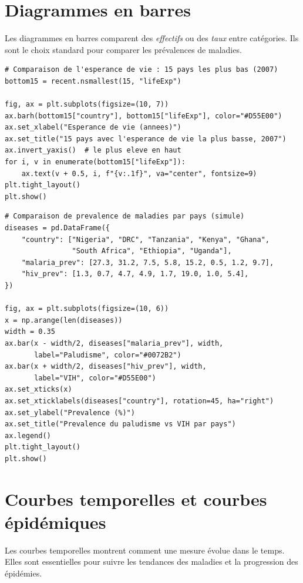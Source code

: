 \section{Diagrammes en barres}

Les diagrammes en barres comparent des \emph{effectifs} ou des \emph{taux} entre cat\'egories. Ils sont le choix standard pour comparer les pr\'evalences de maladies.

\begin{verbatim}
# Comparaison de l'esperance de vie : 15 pays les plus bas (2007)
bottom15 = recent.nsmallest(15, "lifeExp")

fig, ax = plt.subplots(figsize=(10, 7))
ax.barh(bottom15["country"], bottom15["lifeExp"], color="#D55E00")
ax.set_xlabel("Esperance de vie (annees)")
ax.set_title("15 pays avec l'esperance de vie la plus basse, 2007")
ax.invert_yaxis()  # le plus eleve en haut
for i, v in enumerate(bottom15["lifeExp"]):
    ax.text(v + 0.5, i, f"{v:.1f}", va="center", fontsize=9)
plt.tight_layout()
plt.show()
\end{verbatim}

\begin{verbatim}
# Comparaison de prevalence de maladies par pays (simule)
diseases = pd.DataFrame({
    "country": ["Nigeria", "DRC", "Tanzania", "Kenya", "Ghana",
                "South Africa", "Ethiopia", "Uganda"],
    "malaria_prev": [27.3, 31.2, 7.5, 5.8, 15.2, 0.5, 1.2, 9.7],
    "hiv_prev": [1.3, 0.7, 4.7, 4.9, 1.7, 19.0, 1.0, 5.4],
})

fig, ax = plt.subplots(figsize=(10, 6))
x = np.arange(len(diseases))
width = 0.35
ax.bar(x - width/2, diseases["malaria_prev"], width,
       label="Paludisme", color="#0072B2")
ax.bar(x + width/2, diseases["hiv_prev"], width,
       label="VIH", color="#D55E00")
ax.set_xticks(x)
ax.set_xticklabels(diseases["country"], rotation=45, ha="right")
ax.set_ylabel("Prevalence (%)")
ax.set_title("Prevalence du paludisme vs VIH par pays")
ax.legend()
plt.tight_layout()
plt.show()
\end{verbatim}

\section{Courbes temporelles et courbes \'epid\'emiques}

Les courbes temporelles montrent comment une mesure \'evolue dans le temps. Elles sont essentielles pour suivre les tendances des maladies et la progression des \'epid\'emies.

